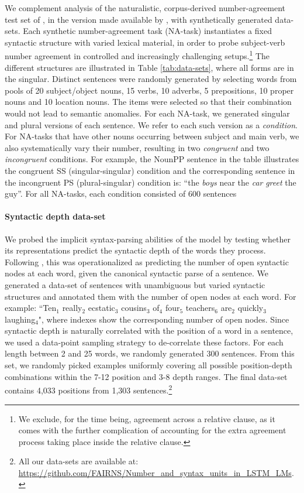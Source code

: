 We complement analysis of the naturalistic, corpus-derived
number-agreement test set of , in the
version made available by , with
synthetically generated data-sets. Each synthetic number-agreement
task (NA-task) instantiates a fixed syntactic structure with varied
lexical material, in order to probe subject-verb number agreement in
controlled and increasingly challenging setups.\footnote{We exclude,
  for the time being, agreement across a relative clause, as it comes
  with the further complication of accounting for the extra agreement
  process taking place inside the relative clause.} The different
structures are illustrated in Table \ref{tab:data-sets}, where all forms are in the singular. Distinct sentences were randomly
generated by selecting words from pools of 20
subject/object nouns, 15 verbs, 10 adverbs, 5 prepositions, 10 proper
nouns and 10 location nouns. The items were selected so that their
combination would not lead to semantic anomalies. For each NA-task, we
generated singular and plural versions of each sentence. We refer to
each such version as a \textit{condition}. For NA-tasks that have
other nouns occurring between subject and main verb, we also
systematically vary their number, resulting in two \textit{congruent}
and two \textit{incongruent} conditions. For example, the NounPP
sentence in the table illustrates the congruent SS (singular-singular)
condition and the corresponding sentence in the incongruent PS
(plural-singular) condition is: ``the \emph{boys} near the \emph{car}
\emph{greet} the guy''. For all NA-tasks, each condition consisted of
600 sentences

\paragraph{Syntactic depth data-set} We probed the implicit
syntax-parsing abilities of the model by testing whether its representations
predict the syntactic depth of the words they process. Following
, this was operationalized as predicting the
number of open syntactic nodes at each word, given the canonical
syntactic parse of a sentence.  We generated a data-set of sentences with
unambiguous but varied syntactic structures and annotated them with the number of open nodes at each word. For example:
``Ten$_1$ really$_2$ ecstatic$_3$ cousins$_3$ of$_4$ four$_5$ teachers$_6$
are$_2$ quickly$_3$ laughing$_4$", where indexes show the corresponding
number of open nodes.
Since syntactic depth is
naturally correlated with the position of a word in a sentence, we
used a data-point sampling strategy to de-correlate these factors. For
each length between 2 and 25 words, we randomly generated 300
sentences. From this set, we randomly picked examples uniformly
covering all possible position-depth combinations within the 7-12
position and 3-8 depth ranges. The final data-set contains 4,033
positions from 1,303 sentences.\footnote{All our data-sets are available at: \url{https://github.com/FAIRNS/Number_and_syntax_units_in_LSTM_LMs}.}
